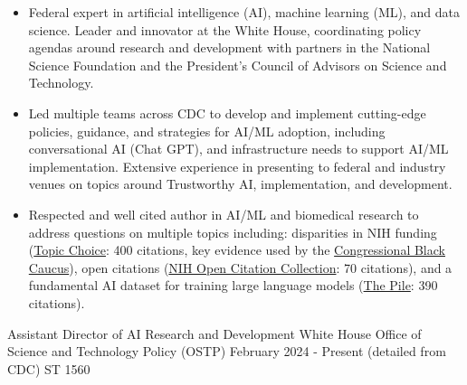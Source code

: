 \documentclass[]{scrartcl}
\begin{document}
\begin{cleanCV}

   \vspace{-1em}

   {
  \vspace{-0.25em}
  \begin{itemize}

  \item Federal expert in artificial intelligence (AI), machine learning (ML), and data science. Leader and innovator at the White House, coordinating policy agendas around research and development with partners in the National Science Foundation and the President's Council of Advisors on Science and Technology.
  \item Led multiple teams across CDC to develop and implement cutting-edge policies, guidance, and strategies for AI/ML adoption, including conversational AI (Chat GPT), and infrastructure needs to support AI/ML implementation. Extensive experience in presenting to federal and industry venues on topics around Trustworthy AI, implementation, and development. 
   \item Respected and well cited author in AI/ML and biomedical research to address questions on multiple topics including: disparities in NIH funding (\href{https://www.science.org/doi/10.1126/sciadv.aaw7238}{Topic Choice}: 400 citations, key evidence used by the \href{https://bluntrochester.house.gov/uploadedfiles/191220_ltr_to_nih_about_grant_disparities.pdf}{Congressional Black Caucus}), open citations (\href{https://www.ncbi.nlm.nih.gov/pmc/articles/PMC6786512/}{NIH Open Citation Collection}: 70 citations), and a fundamental AI dataset for training large language models (\href{https://arxiv.org/abs/2101.00027}{The Pile}: 390 citations).

  \end{itemize}
}

  \vspace{-1em}

\WorkExperience
{}
{Assistant Director of AI Research and Development}
{
  \newline White House Office of Science and Technology Policy (OSTP)
  \newline February 2024 - Present (detailed from CDC)
  \newline ST 1560
}
{
  \vspace{-0.25em}
  \begin{itemize}


\end{itemize}}
\end{cleanCV}
\end{document}
